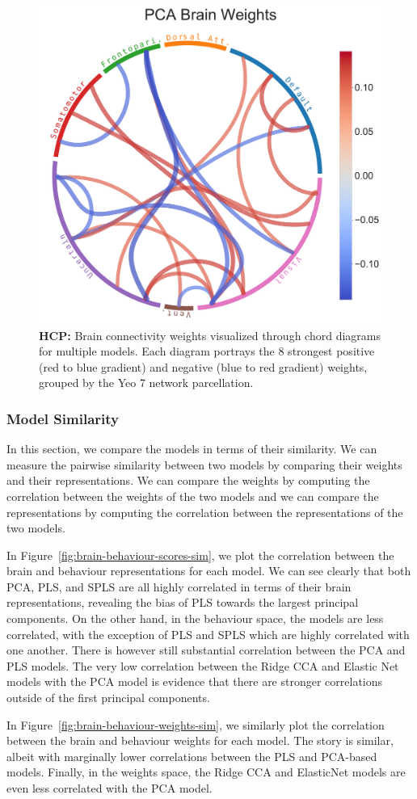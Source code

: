 \begin{figure}[h]
    \includegraphics[width=0.49\linewidth]{figures/hcp/PCA brain weights}
    \caption{\textbf{HCP:} Brain connectivity weights visualized through chord diagrams for multiple models. Each diagram portrays the 8 strongest positive (red to blue gradient) and negative (blue to red gradient) weights, grouped by the Yeo 7 network parcellation.}\label{fig:chord_weights}
\end{figure}

\subsubsection{Model Similarity}

In this section, we compare the models in terms of their similarity.
We can measure the pairwise similarity between two models by comparing their \gls{weights} and their \gls{representations}.
We can compare the \gls{weights} by computing the correlation between the \gls{weights} of the two models and we can compare the \gls{representations} by computing the correlation between the \gls{representations} of the two models.

In Figure~\ref{fig:brain-behaviour-scores-sim}, we plot the correlation between the brain and behaviour \gls{representations} for each model. 
We can see clearly that both PCA, PLS, and SPLS are all highly correlated in terms of their brain representations, revealing the bias of PLS towards the largest principal components.
On the other hand, in the behaviour space, the models are less correlated, with the exception of PLS and SPLS which are highly correlated with one another. 
There is however still substantial correlation between the PCA and PLS models.
The very low correlation between the Ridge CCA and Elastic Net models with the PCA model is evidence that there are stronger correlations outside of the first principal components.

In Figure~\ref{fig:brain-behaviour-weights-sim}, we similarly plot the correlation between the brain and behaviour \gls{weights} for each model. 
The story is similar, albeit with marginally lower correlations between the PLS and PCA-based models. Finally, in the weights space, the Ridge CCA and ElasticNet models are even less correlated with the PCA model.


